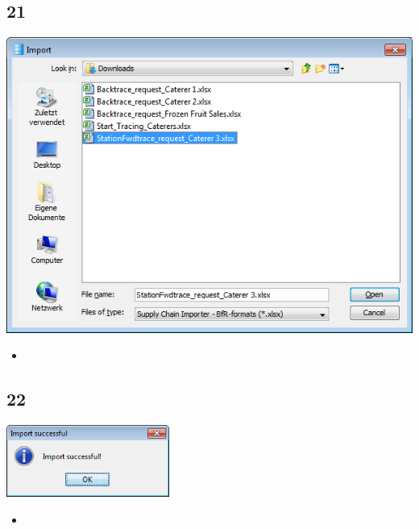 \documentclass{beamer}
\begin{document}
\subsection{21}
\begin{frame}
	\begin{center}
  		\includegraphics[height=0.5\textheight]{21.png}
	\end{center}
	\begin{itemize}
		\item
	\end{itemize}
\end{frame}

\subsection{22}
\begin{frame}
	\begin{center}
  		\includegraphics[width=0.4\textwidth]{22.png}
	\end{center}
	\begin{itemize}
		\item
	\end{itemize}
\end{frame}
\end{document}
